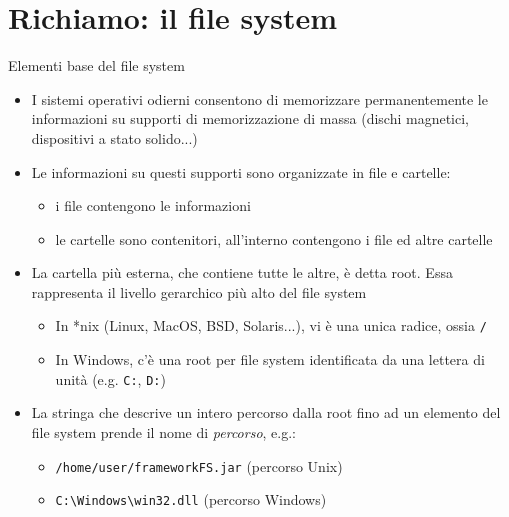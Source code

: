 \documentclass[presentation]{beamer}
\begin{document}
\section{Richiamo: il file system}
\begin{frame}{Elementi base del file system}
  \begin{itemize}
    \item I sistemi operativi odierni consentono di memorizzare permanentemente le informazioni su 
supporti di memorizzazione di massa (dischi magnetici, dispositivi a stato solido...)
    \item Le informazioni su questi supporti sono organizzate in file e cartelle:
      \begin{itemize}
        \item i file contengono le informazioni
        \item le cartelle sono contenitori, all'interno contengono i file ed altre cartelle
      \end{itemize}
    \item La cartella più esterna, che contiene tutte le altre, è detta root. Essa rappresenta il livello gerarchico più alto del file system
      \begin{itemize}
        \item In *nix (Linux, MacOS, BSD, Solaris...), vi è una unica radice, ossia \texttt{/}
        \item In Windows, c'è una root per file system identificata da una lettera di unità (e.g. 
\texttt{C:}, \texttt{D:})
      \end{itemize}
    \item La stringa che descrive un intero percorso dalla root fino ad un elemento del file system
prende il nome di \emph{percorso}, e.g.:
    \begin{itemize}
        \item \texttt{/home/user/frameworkFS.jar} (percorso Unix)
        \item \texttt{C:\textbackslash{}Windows\textbackslash{}win32.dll} (percorso Windows)
    \end{itemize}
  \end{itemize}
\end{frame}
\end{document}
